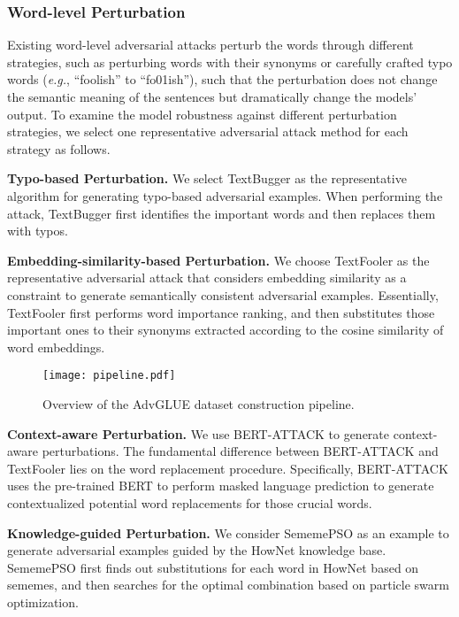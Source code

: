 \documentclass{article}
\begin{document}
\subsubsection{Word-level Perturbation}
Existing word-level adversarial attacks perturb the words through different strategies, such as perturbing words with their synonyms \citep{textfooler} or carefully crafted typo words \citep{textbugger} (\emph{e.g.}, ``foolish'' to ``fo01ish''), such that the perturbation does not change the semantic meaning of the sentences but dramatically change the models' output. 
To examine the model robustness against different perturbation strategies, we select one representative adversarial attack method for each strategy as follows.

\textbf{Typo-based Perturbation.}  We select TextBugger \citep{textbugger} as the representative algorithm for generating typo-based adversarial examples. 
When performing the attack, TextBugger first identifies the important words and then replaces them with typos. 


\textbf{Embedding-similarity-based Perturbation.} 
We choose TextFooler \citep{textfooler} as the representative adversarial attack that considers embedding similarity as a constraint to generate semantically consistent adversarial examples. Essentially, TextFooler first performs word importance ranking, and then substitutes those important ones to their synonyms extracted according to the cosine similarity of word embeddings.



\begin{figure}
    \centering
    \texttt{[image: pipeline.pdf]}
    \caption{\small Overview of the AdvGLUE dataset construction pipeline.}
    \label{fig:overview}
\end{figure}




\textbf{Context-aware Perturbation.} We use BERT-ATTACK \citep{bertattack} to generate context-aware perturbations. 
The fundamental difference between BERT-ATTACK and TextFooler lies on the word replacement procedure. Specifically, BERT-ATTACK uses the pre-trained BERT to perform masked language prediction to generate contextualized potential word replacements for those crucial words. 


\textbf{Knowledge-guided Perturbation.} We consider SememePSO \citep{comattack} as an example to generate adversarial examples guided by the HowNet \citep{hownet} knowledge base. 
SememePSO first finds out substitutions for each word in HowNet based on sememes, and then searches for the optimal combination based on particle swarm optimization. 
\end{document}

